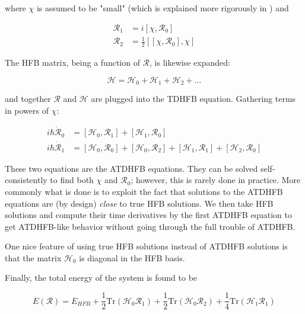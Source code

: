 \noindent where $\chi$ is assumed to be "small" (which is explained more rigorously in \cite{Baranger1978}) and

\begin{align}\label{eqn:densities}
\mathcal{R}_1 &= i\left[\chi, \mathcal{R}_0\right] \\
\mathcal{R}_2 &= \frac{1}{2}\left[\left[\chi, \mathcal{R}_0\right], \chi\right] 
\end{align}

\noindent The HFB matrix, being a function of $\mathcal{R}$, is likewise expanded:

\begin{equation*}
\mathcal{H} = \mathcal{H}_0 + \mathcal{H}_1 + \mathcal{H}_2 + \dots
\end{equation*}

\noindent and together $\mathcal{R}$ and $\mathcal{H}$ are plugged into the TDHFB equation. Gathering terms in powers of $\chi$:

\begin{align}\label{eqn:ATDHFB}
i\hbar\mathcal{\dot{R}}_0 &= \left[\mathcal{H}_0, \mathcal{R}_1\right] + \left[\mathcal{H}_1, \mathcal{R}_0\right] \\
i\hbar\mathcal{\dot{R}}_1 &= \left[\mathcal{H}_0, \mathcal{R}_0\right] + \left[\mathcal{H}_0, \mathcal{R}_2\right]
 + \left[\mathcal{H}_1, \mathcal{R}_1\right] + \left[\mathcal{H}_2, \mathcal{R}_0\right]
\end{align}

\noindent These two equations are the ATDHFB equations. They can be solved self-consistently to find both $\chi$ and $\mathcal{R}_0$; however, this is rarely done in practice. More commonly what is done is to exploit the fact that solutions to the ATDHFB equations are (by design) \textit{close} to true HFB solutions. We then take HFB solutions and compute their time derivatives by the first ATDHFB equation to get ATDHFB-like behavior without going through the full trouble of ATDHFB.

One nice feature of using true HFB solutions instead of ATDHFB solutions is that the matrix $\mathcal{H}_0$ is diagonal in the HFB basis.

Finally, the total energy of the system is found to be

\begin{equation*}
E(\mathcal{R}) = E_{HFB} + \frac{1}{2}\mathrm{Tr}\left(\mathcal{H}_0\mathcal{R}_1\right) + \frac{1}{2}\mathrm{Tr}\left(\mathcal{H}_0\mathcal{R}_2\right) + \frac{1}{4}\mathrm{Tr}\left(\mathcal{H}_1\mathcal{R}_1\right)
\end{equation*}

